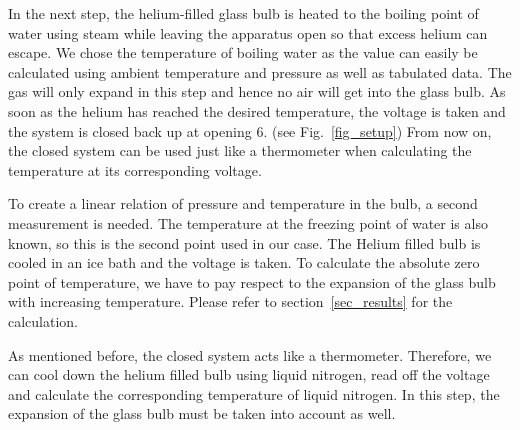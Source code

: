     In the next step, the helium-filled glass bulb is heated to the boiling point of water using steam while leaving the apparatus open so that excess helium can escape.
    We chose the temperature of boiling water as the value can easily be calculated using ambient temperature and pressure as well as tabulated data.
    The gas will only expand in this step and hence no air will get into the glass bulb.
    As soon as the helium has reached the desired temperature, the voltage is taken and the system is closed back up at opening 6. (see Fig.~\ref{fig_setup})
    From now on, the closed system can be used just like a thermometer when calculating the temperature at its corresponding voltage.
    
    To create a linear relation of pressure and temperature in the bulb, a second measurement is needed.
    The temperature at the freezing point of water is also known, so this is the second point used in our case.
    The Helium filled bulb is cooled in an ice bath and the voltage is taken.
    To calculate the absolute zero point of temperature, we have to pay respect to the expansion of the glass bulb with increasing temperature.
    Please refer to section~\ref{sec_results} for the calculation.

    As mentioned before, the closed system acts like a thermometer.
    Therefore, we can cool down the helium filled bulb using liquid nitrogen, read off the voltage and calculate the corresponding temperature of liquid nitrogen.
    In this step, the expansion of the glass bulb must be taken into account as well.

